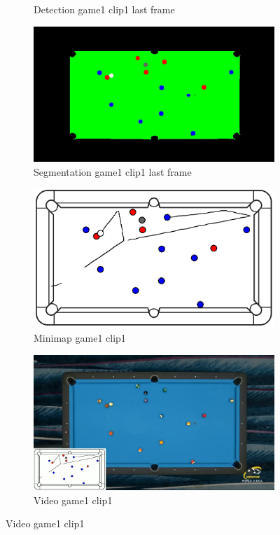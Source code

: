 \begin{figure}[H]
\begin{subfigure}[b]{0.48\textwidth}
		\caption{Detection game1 clip1 last frame}
		\label{fig: game1_clip1_last_frame_detected}
	\end{subfigure}
	\begin{subfigure}[b]{0.48\textwidth}
		\centering
		\includegraphics[width=\textwidth]{images/Segmentation/game1_clip1_segmented_balls_last_frame.jpg}
		\caption{Segmentation game1 clip1 last frame}
		\label{fig: game1_clip1_last_frame_segmented}
	\end{subfigure}
	\begin{subfigure}[b]{0.48\textwidth}
		\centering
		\includegraphics[width=\textwidth]{images/AllMinimap/game1_clip1_minimap.png}
		\caption{Minimap game1 clip1}
		\label{fig: game1_clip1_minimap}
	\end{subfigure}
	\begin{subfigure}[b]{0.48\textwidth}
		\centering
		\includegraphics[width=\textwidth]{images/Video/game1_clip1_video.jpg}
		\caption{Video game1 clip1}
		\label{fig: game1_clip1_video}
	\end{subfigure}


\end{figure}
